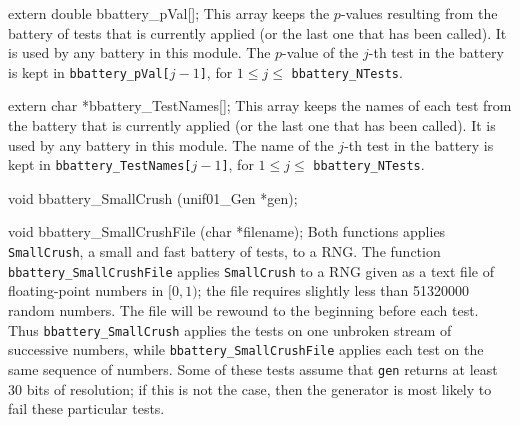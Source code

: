 extern double bbattery_pVal[];
\endcode
  \tab This array keeps the $p$-values resulting from the  battery of tests
  that is currently applied (or the last one that has been called). It is
  used by any battery in this module. The $p$-value of the $j$-th test in
  the battery is kept in {\tt bbattery\_pVal[$j-1$]}, for $1\le j\le $
  {\tt bbattery\_NTests}.
 \endtab
\code


extern char *bbattery_TestNames[];
\endcode
  \tab This array keeps the names of each test from  the
  battery that is currently applied (or the last one that has
  been called). It is used by any battery in this module.
  The name of the $j$-th test in the battery is
   kept in {\tt bbattery\_TestNames[$j-1$]},
  for $1\le j\le $ {\tt bbattery\_NTests}.
 \endtab



\code

void bbattery_SmallCrush (unif01_Gen *gen);

void bbattery_SmallCrushFile (char *filename);
\endcode
  \tab  Both functions applies {\tt SmallCrush}, a small and fast battery
   of tests, to a RNG. The function {\tt bbattery\_Small\-CrushFile} applies
  {\tt SmallCrush} to a RNG given as a text file of floating-point numbers in
  $[0, 1)$; the file requires slightly less than 51320000 random numbers.
   \label{bat:SmallCrush}
   The file will be rewound to the beginning before each test.
  Thus  {\tt bbattery\_SmallCrush} applies the tests on one unbroken
  stream of successive numbers, while {\tt bbattery\_Small\-CrushFile}
  applies each test on the same sequence of numbers.
  Some of these tests assume that {\tt gen} returns at least 30 bits of
  resolution; if this is not the case, then the generator is most likely to
  fail these particular tests.


